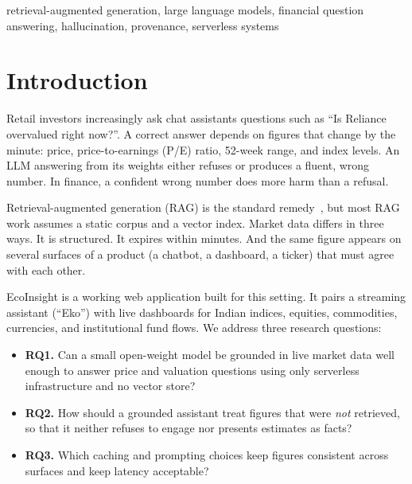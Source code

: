 \documentclass[conference]{IEEEtran}
\begin{document}
\begin{IEEEkeywords}
retrieval-augmented generation, large language models, financial question answering, hallucination, provenance, serverless systems
\end{IEEEkeywords}

\section{Introduction}

Retail investors increasingly ask chat assistants questions such as ``Is Reliance overvalued right now?''. A correct answer depends on figures that change by the minute: price, price-to-earnings (P/E) ratio, 52-week range, and index levels. An LLM answering from its weights either refuses or produces a fluent, wrong number. In finance, a confident wrong number does more harm than a refusal.

Retrieval-augmented generation (RAG) is the standard remedy~\cite{lewis2020rag}, but most RAG work assumes a static corpus and a vector index. Market data differs in three ways. It is structured. It expires within minutes. And the same figure appears on several surfaces of a product (a chatbot, a dashboard, a ticker) that must agree with each other.

EcoInsight is a working web application built for this setting. It pairs a streaming assistant (``Eko'') with live dashboards for Indian indices, equities, commodities, currencies, and institutional fund flows. We address three research questions:

\begin{itemize}
\item \textbf{RQ1.} Can a small open-weight model be grounded in live market data well enough to answer price and valuation questions using only serverless infrastructure and no vector store?
\item \textbf{RQ2.} How should a grounded assistant treat figures that were \emph{not} retrieved, so that it neither refuses to engage nor presents estimates as facts?
\item \textbf{RQ3.} Which caching and prompting choices keep figures consistent across surfaces and keep latency acceptable?
\end{itemize}
\end{document}
